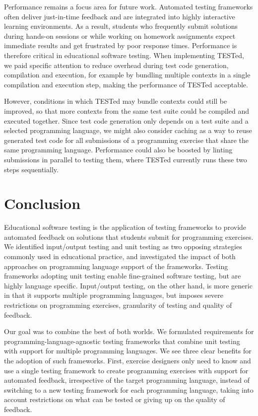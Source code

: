 \documentclass[../main]{subfiles}
\begin{document}
Performance remains a focus area for future work.
Automated testing frameworks often deliver just-in-time feedback and are integrated into highly interactive learning environments.
As a result, students who frequently submit solutions during hands-on sessions or while working on homework assignments expect immediate results and get frustrated by poor response times.
Performance is therefore critical in educational software testing.
When implementing TESTed, we paid specific attention to reduce overhead during test code generation, compilation and execution, for example by bundling multiple contexts in a single compilation and execution step, making the performance of TESTed acceptable.

However, conditions in which TESTed may bundle contexts could still be improved, so that more contexts from the same test suite could be compiled and executed together.
Since test code generation only depends on a test suite and a selected programming language, we might also consider caching as a way to reuse generated test code for all submissions of a programming exercise that share the same programming language.
Performance could also be boosted by linting submissions in parallel to testing them, where TESTed currently runs these two steps sequentially.

\section{Conclusion}\label{sec:tested1-conclusion}

Educational software testing is the application of testing frameworks to provide automated feedback on solutions that students submit for programming exercises.
We identified input/output testing and unit testing as two opposing strategies commonly used in educational practice, and investigated the impact of both approaches on programming language support of the frameworks.
Testing frameworks adopting unit testing enable fine-grained software testing, but are highly language specific.
Input/output testing, on the other hand, is more generic in that it supports multiple programming languages, but imposes severe restrictions on programming exercises, granularity of testing and quality of feedback.

Our goal was to combine the best of both worlds.
We formulated requirements for programming-language-agnostic testing frameworks that combine unit testing with support for multiple programming languages.
We see three clear benefits for the adoption of such frameworks.
First, exercise designers only need to know and use a single testing framework to create programming exercises with support for automated feedback, irrespective of the target programming language, instead of switching to a new testing framework for each programming language, taking into account restrictions on what can be tested or giving up on the quality of feedback.
\end{document}
